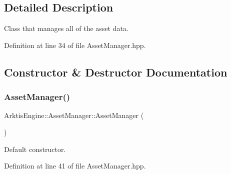 \subsection{Detailed Description}
Class that manages all of the asset data. 

\begin{DoxyVerb}\end{DoxyVerb}
 

Definition at line 34 of file Asset\+Manager.\+hpp.



\subsection{Constructor \& Destructor Documentation}
\mbox{\label{class_arktis_engine_1_1_asset_manager_a83b4e37fd637e66918ecc86fe583247e}} 
\subsubsection{\texorpdfstring{AssetManager()}{AssetManager()}}
{\footnotesize\ttfamily Arktis\+Engine\+::\+Asset\+Manager\+::\+Asset\+Manager (\begin{DoxyParamCaption}{ }\end{DoxyParamCaption})\hspace{0.3cm}{\ttfamily [inline]}}



Default constructor. 

\begin{DoxyVerb}\end{DoxyVerb}
 

Definition at line 41 of file Asset\+Manager.\+hpp.


\begin{DoxyCode}{0}

\end{DoxyCode}
\mbox{\label{class_arktis_engine_1_1_asset_manager_a1fb7409422cd902a2b1cafead009a6d2}} 
